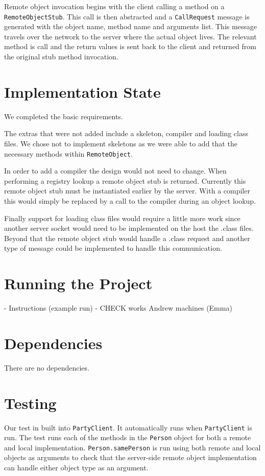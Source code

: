 \documentclass[12pt]{article}
\begin{document}
Remote object invocation begins with the client calling a method on a \texttt{RemoteObjectStub}. This call is then abstracted and a \texttt{CallRequest} message is generated with the object name, method name and arguments list. This message travels over the network to the server where the actual object lives. The relevant method is call and the return values is sent back to the client and returned from the original stub method invocation.


\section{Implementation State}

We completed the basic requirements.

The extras that were not added include a skeleton, compiler and loading class files. We chose not to implement skeletons as we were able to add that the necessary methods within \texttt{RemoteObject}.

In order to add a compiler the design would not need to change. When performing a registry lookup a remote object stub is returned. Currently this remote object stub must be instantiated earlier by the server. With a compiler this would simply be replaced by a call to the compiler during an object lookup.

Finally support for loading class files would require a little more work since another server socket would need to be implemented on the host the .class files. Beyond that the remote object stub would handle a .class request and another type of message could be implemented to handle this communication.


\section{Running the Project}

- Instructions (example run)
- CHECK works Andrew machines
(Emma)


\section{Dependencies}

There are no dependencies.


\section{Testing}

Our test in built into \texttt{PartyClient}. It automatically runs when \texttt{PartyClient} is run. The test runs each of the methods in the \texttt{Person} object for both a remote and local implementation. \texttt{Person.samePerson} is run using both remote and local objects as arguments to check that the server-side remote object implementation can handle either object type as an argument.
\end{document}
